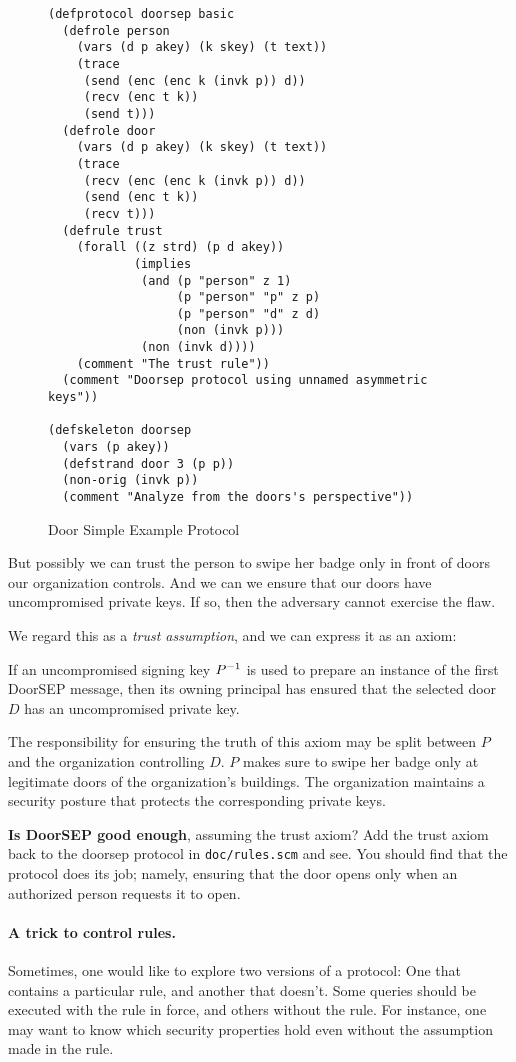 \begin{figure}\small
\begin{verbatim}
(defprotocol doorsep basic
  (defrole person
    (vars (d p akey) (k skey) (t text))
    (trace
     (send (enc (enc k (invk p)) d))
     (recv (enc t k))
     (send t)))
  (defrole door
    (vars (d p akey) (k skey) (t text))
    (trace
     (recv (enc (enc k (invk p)) d))
     (send (enc t k))
     (recv t)))
  (defrule trust
    (forall ((z strd) (p d akey))
            (implies
             (and (p "person" z 1)
                  (p "person" "p" z p)
                  (p "person" "d" z d)
                  (non (invk p)))
             (non (invk d))))
    (comment "The trust rule"))
  (comment "Doorsep protocol using unnamed asymmetric keys"))

(defskeleton doorsep
  (vars (p akey))
  (defstrand door 3 (p p))
  (non-orig (invk p))
  (comment "Analyze from the doors's perspective"))
\end{verbatim}
\caption{Door Simple Example Protocol}\label{fig:doorsep}
\end{figure}

But possibly we can trust the person to swipe her badge only in front
of doors our organization controls.  And we can we ensure that our
doors have uncompromised private keys.  If so, then the adversary
cannot exercise the flaw.

We regard this as a \emph{trust assumption}, and we can express it as
an axiom:
%
\begin{axiom}\label{axiom:trust assumption}
  If an uncompromised signing key ${{P}^{-1}}$ is used to prepare an
  instance of the first DoorSEP message, then its owning principal has
  ensured that the selected door $D$ has an uncompromised private key.
\end{axiom}
%
The responsibility for ensuring the truth of this axiom may be split
between $P$ and the organization controlling $D$.  $P$ makes sure to
swipe her badge only at legitimate doors of the organization's
buildings.  The organization maintains a security posture that
protects the corresponding private keys.

\medskip\noindent\textbf{Is DoorSEP good enough}, assuming the trust
axiom?  Add the trust axiom back to the doorsep protocol in
\texttt{doc/rules.scm} and see.  You should find that the protocol
does its job; namely, ensuring that the door opens only when an
authorized person requests it to open.

\paragraph{A trick to control rules.}  Sometimes, one would like to
explore two versions of a protocol:  One that contains a particular
rule, and another that doesn't.  Some {\cpsa} queries should be
executed with the rule in force, and others without the rule.  For
instance, one may want to know which security properties hold even
without the assumption made in the rule.  


